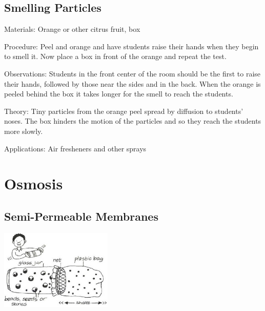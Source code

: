 \begin{multicols}{2}
\subsection{Smelling Particles}

\begin{description*}
\item[Materials:]{Orange or other citrus fruit, box}
\item[Procedure:]{Peel and orange and have students raise their hands when they begin to smell it. Now place a box in front of the orange and repeat the test.}
\item[Observations:]{Students in the front center of the room should be the first to raise their hands, followed by those near the sides and in the back. When the orange is peeled behind the box it takes longer for the smell to reach the students.}
\item[Theory:]{Tiny particles from the orange peel spread by diffusion to students' noses. The box hinders the motion of the particles and so they reach the students more slowly.}
\item[Applications:]{Air fresheners and other sprays}
\end{description*}


\section*{Osmosis} 




\subsection{Semi-Permeable Membranes}

\begin{center}
\includegraphics[width=0.4\textwidth]{./img/vso/membrane.jpg}
\end{center}


\end{multicols}
